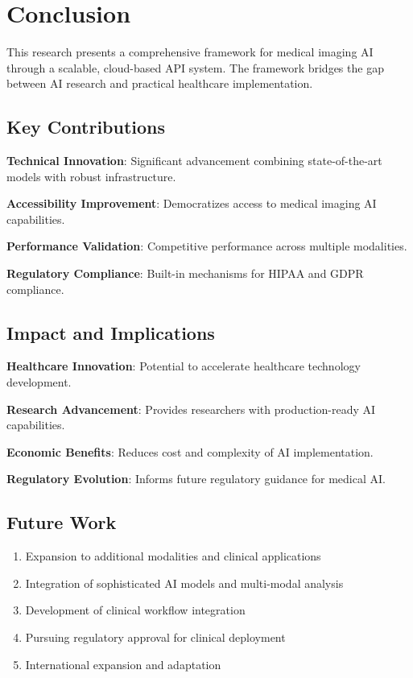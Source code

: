 \documentclass[12pt,a4paper]{article}
\begin{document}
\section{Conclusion}

This research presents a comprehensive framework for medical imaging AI through a scalable, cloud-based API system. The framework bridges the gap between AI research and practical healthcare implementation.

\subsection{Key Contributions}

\textbf{Technical Innovation}: Significant advancement combining state-of-the-art models with robust infrastructure.

\textbf{Accessibility Improvement}: Democratizes access to medical imaging AI capabilities.

\textbf{Performance Validation}: Competitive performance across multiple modalities.

\textbf{Regulatory Compliance}: Built-in mechanisms for HIPAA and GDPR compliance.

\subsection{Impact and Implications}

\textbf{Healthcare Innovation}: Potential to accelerate healthcare technology development.

\textbf{Research Advancement}: Provides researchers with production-ready AI capabilities.

\textbf{Economic Benefits}: Reduces cost and complexity of AI implementation.

\textbf{Regulatory Evolution}: Informs future regulatory guidance for medical AI.

\subsection{Future Work}

\begin{enumerate}
    \item Expansion to additional modalities and clinical applications
    \item Integration of sophisticated AI models and multi-modal analysis
    \item Development of clinical workflow integration
    \item Pursuing regulatory approval for clinical deployment
    \item International expansion and adaptation
\end{enumerate}
\end{document}
